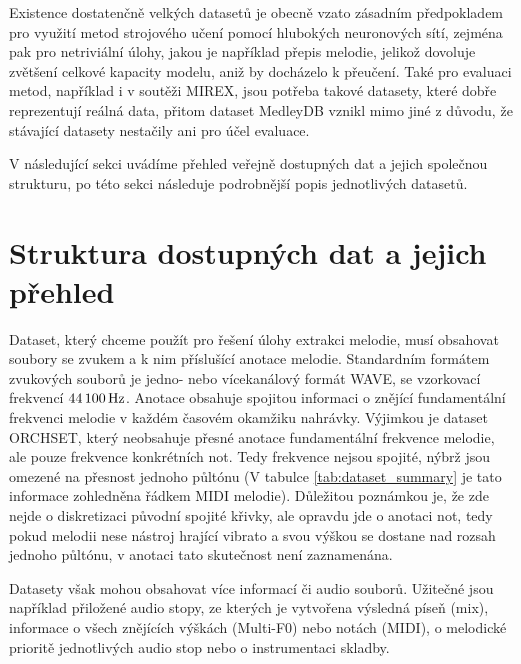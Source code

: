 Existence dostatenčně velkých datasetů je obecně vzato zásadním předpokladem pro využití metod strojového učení pomocí hlubokých neuronových sítí, zejména pak pro netriviální úlohy, jakou je například přepis melodie, jelikož dovoluje zvětšení celkové kapacity modelu, aniž by docházelo k přeučení. Také pro evaluaci metod, například i v soutěži MIREX, jsou potřeba takové datasety, které dobře reprezentují reálná data, přitom dataset MedleyDB vznikl mimo jiné z důvodu, že stávající datasety nestačily ani pro účel evaluace. 

V následující sekci uvádíme přehled veřejně dostupných dat a jejich společnou strukturu, po této sekci následuje podrobnější popis jednotlivých datasetů.




\section{Struktura dostupných dat a jejich přehled}

Dataset, který chceme použít pro řešení úlohy extrakci melodie, musí obsahovat soubory se zvukem a k nim příslušící anotace melodie. Standardním formátem zvukových souborů je jedno- nebo vícekanálový formát WAVE, se vzorkovací frekvencí $44\,100\,\rm Hz$. Anotace obsahuje spojitou informaci o znějící fundamentální frekvenci melodie v každém časovém okamžiku nahrávky. Výjimkou je dataset ORCHSET, který neobsahuje přesné anotace fundamentální frekvence melodie, ale pouze frekvence konkrétních not. Tedy frekvence nejsou spojité, nýbrž jsou omezené na přesnost jednoho půltónu (V tabulce \ref{tab:dataset_summary} je tato informace zohledněna řádkem MIDI melodie). Důležitou poznámkou je, že zde nejde o diskretizaci původní spojité křivky, ale opravdu jde o anotaci not, tedy pokud melodii nese nástroj hrající vibrato a svou výškou se dostane nad rozsah jednoho půltónu, v anotaci tato skutečnost není zaznamenána. 

Datasety však mohou obsahovat více informací či audio souborů. Užitečné jsou například přiložené audio stopy, ze kterých je vytvořena výsledná píseň (mix), informace o všech znějících výškách (Multi-F0) nebo notách (MIDI), o melodické prioritě jednotlivých audio stop nebo o instrumentaci skladby.

